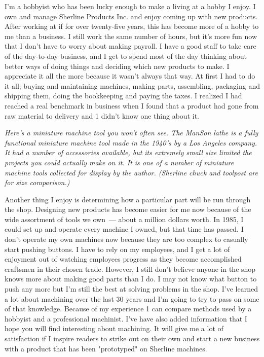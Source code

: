 
I'm a hobbyist who has been lucky enough to make a living at a hobby I enjoy. I
own and manage Sherline Products Inc. and enjoy coming up with new products.
After working at if for over twenty-five years, this has become more of a hobby
to me than a business. I still work the same number of hours, but it's more fun
now that I don't have to worry about making payroll. I have a good staff to take
care of the day-to-day business, and I get to spend most of the day thinking
about better ways of doing things and deciding which new products to make. I
appreciate it all the more because it wasn't always that way. At first I had to
do it all; buying and maintaining machines, making parts, assembling, packaging
and shipping them, doing the bookkeeping and paying the taxes. I realized I had
reached a real benchmark in business when I found that a product had gone from
raw material to delivery and 1 didn't know one thing about it.

\bigskip\textit{Here's a miniature machine tool you won't often see. The ManSon
lathe is a fully functional miniature machine tool made in the 1940's by a Los
Angeles company. It had a number of accessories available, but its extremely
small size limited the projects you could actually make on it. It is one of a
number of miniature machine tools collected for display by the author. (Sherline
chuck and toolpost are for size comparison.)}\bigskip


Another thing I enjoy is determining how a particular part will be run through
the shop. Designing new products has become easier for me now because of the
wide assortment of tools we own\ --- about a million dollars worth. In 1985, I
could set up and operate every machine I owned, but that time has passed. I
don't operate my own machines now because they are too complex to casually start
pushing buttons. I have to rely on my employees, and I get a lot of enjoyment
out of watching employees progress as they become accomplished craftsmen in
their chosen trade. However, I still don't believe anyone in the shop knows more
about making good parts than I do. I may not know what button to push any more
but I'm still the best at solving problems in the shop. I've learned a lot about
machining over the last 30 years and I'm going to try to pass on some of that
knowledge. Because of my experience 1 can compare methods used by a hobbyist and
a professional machinist. I've have also added information that I hope you will
find interesting about machining. It will give me a lot of satisfaction if I
inspire readers to strike out on their own and start a new business with a
product that has been "prototyped" on Sherline machines.

